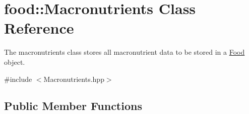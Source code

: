 \hypertarget{classfood_1_1_macronutrients}{}\section{food\+:\+:Macronutrients Class Reference}
\label{classfood_1_1_macronutrients}


The macronutrients class stores all macronutrient data to be stored in a \hyperlink{classfood_1_1_food}{Food} object.  




{\ttfamily \#include $<$Macronutrients.\+hpp$>$}

\subsection*{Public Member Functions}
